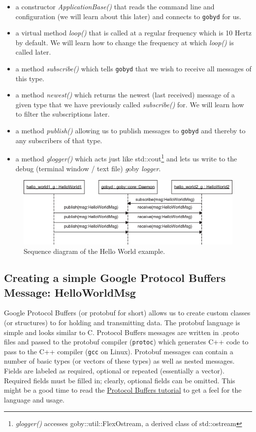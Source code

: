 \documentclass[11pt, letterpaper]{article}
\begin{document}
\begin{itemize}
\item a constructor \textit{ApplicationBase()} that reads the command line and configuration (we will learn about this later) and connects to \texttt{gobyd} for us.
\item a virtual method \textit{loop()} that is called at a regular frequency which is 10 Hertz by default. We will learn how to change the frequency at which \textit{loop()} is called later. 
\item a method \textit{subscribe()} which tells \texttt{gobyd} that we wish to receive all messages of this type.
\item a method \textit{newest()} which returns the newest (last received) message of a given type that we have previously called \textit{subscribe()} for. We will learn how to filter the subscriptions later.
\item a method \textit{publish()} allowing us to publish messages to \texttt{gobyd} and thereby to any subscribers of that type.
\item a method \textit{glogger()} which acts just like std::cout\footnote{\textit{glogger()} accesses goby::util::FlexOstream, a derived class of std::ostream} and lets us write to the debug (terminal window / text file) \textit{g}oby \textit{logger}.
\end{itemize}


\begin{figure}
\centering
\includegraphics[scale=0.9]{hello_world_sequence}
\caption{Sequence diagram of the Hello World example.}
\label{fig:hellow_world_sequence}
\end{figure}


\subsection{Creating a simple Google Protocol Buffers Message: HelloWorldMsg}

Google Protocol Buffers (or protobuf for short) allows us to create custom classes (or structures) to for holding and transmitting data. The protobuf language is simple and looks similar to C. Protocol Buffers messages are written in .proto files and passed to the protobuf compiler (\texttt{protoc}) which generates C++ code to pass to the C++ compiler (\texttt{gcc} on Linux). Protobuf messages can contain a number of basic types (or vectors of these types) as well as nested messages. Fields are labeled as required, optional or repeated (essentially a vector). Required fields must be filled in; clearly, optional fields can be omitted. This might be a good time to read the \href{http://code.google.com/apis/protocolbuffers/docs/cpptutorial.html}{Protocol Buffers tutorial} to get a feel for the language and usage.
\end{document}
